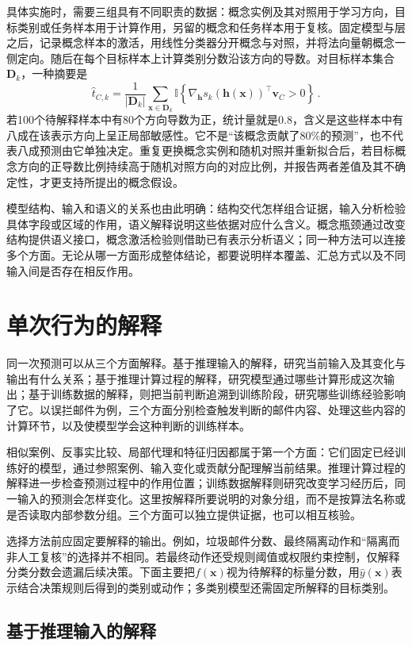 具体实施时，需要三组具有不同职责的数据：概念实例及其对照用于学习方向，目标类别或任务样本用于计算作用，另留的概念和任务样本用于复核。固定模型与层之后，记录概念样本的激活，用线性分类器分开概念与对照，并将法向量朝概念一侧定向。随后在每个目标样本上计算类别分数沿该方向的导数。对目标样本集合$\bm D_k$，一种摘要是
\[
 \widehat t_{C,k}
 =\frac1{|\bm D_k|}\sum_{\bm{x}\in\bm D_k}
 \mathbb I\!\left\{
 \nabla_{\bm h}s_k(\bm h(\bm{x}))^\top\bm v_C>0
 \right\}\, .
\]
若100个待解释样本中有80个方向导数为正，统计量就是0.8，含义是这些样本中有八成在该表示方向上呈正局部敏感性。它不是“该概念贡献了80\%的预测”，也不代表八成预测由它单独决定。重复更换概念实例和随机对照并重新拟合后，若目标概念方向的正导数比例持续高于随机对照方向的对应比例，并报告两者差值及其不确定性，才更支持所提出的概念假设。

模型结构、输入和语义的关系也由此明确：结构交代怎样组合证据，输入分析检验具体字段或区域的作用，语义解释说明这些依据对应什么含义。概念瓶颈通过改变结构提供语义接口，概念激活检验则借助已有表示分析语义；同一种方法可以连接多个方面。无论从哪一方面形成整体结论，都要说明样本覆盖、汇总方式以及不同输入间是否存在相反作用。

\section{单次行为的解释}
\label{sec:interpretability-local}

同一次预测可以从三个方面解释。基于推理输入的解释，研究当前输入及其变化与输出有什么关系；基于推理计算过程的解释，研究模型通过哪些计算形成这次输出；基于训练数据的解释，则把当前判断追溯到训练阶段，研究哪些训练经验影响了它。以误拦邮件为例，三个方面分别检查触发判断的邮件内容、处理这些内容的计算环节，以及使模型学会这种判断的训练样本。

相似案例、反事实比较、局部代理和特征归因都属于第一个方面：它们固定已经训练好的模型，通过参照案例、输入变化或贡献分配理解当前结果。推理计算过程的解释进一步检查预测过程中的作用位置；训练数据解释则研究改变学习经历后，同一输入的预测会怎样变化。这里按解释所要说明的对象分组，而不是按算法名称或是否读取内部参数分组。三个方面可以独立提供证据，也可以相互核验。

选择方法前应固定要解释的输出。例如，垃圾邮件分数、最终隔离动作和“隔离而非人工复核”的选择并不相同。若最终动作还受规则阈值或权限约束控制，仅解释分类分数会遗漏后续决策。下面主要把$f(\bm{x})$视为待解释的标量分数，用$\hat y(\bm{x})$表示结合决策规则后得到的类别或动作；多类别模型还需固定所解释的目标类别。

\subsection{基于推理输入的解释}
\label{sec:interpretability-local-input}

